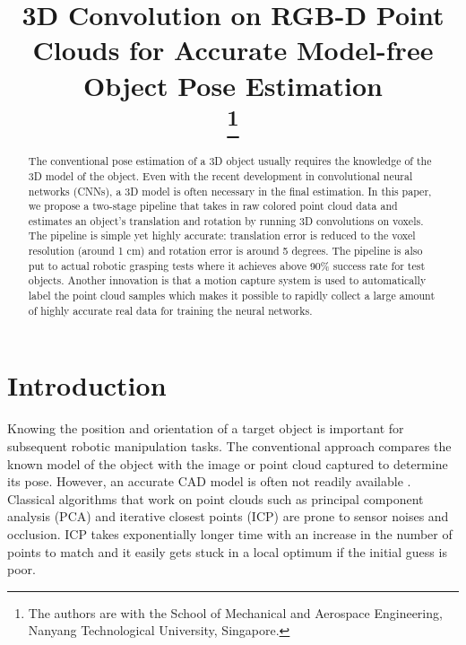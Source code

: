 \documentclass[conference]{IEEEtran}
\begin{document}
\title{3D Convolution on RGB-D Point Clouds for Accurate Model-free Object Pose Estimation \\
\thanks{The authors are with the School of Mechanical and Aerospace Engineering, Nanyang Technological University, Singapore.
}
}

\author{
\and
{}
\and
{}
}

\maketitle

\begin{abstract}
The conventional pose estimation of a 3D object usually requires the knowledge of the 3D model of the object. Even with the recent development in convolutional neural networks (CNNs), a 3D model is often necessary in the final estimation. In this paper, we propose a  two-stage pipeline that takes in raw colored point cloud data and estimates an object’s translation and rotation by running 3D convolutions on voxels. The pipeline is simple yet highly accurate: translation error is reduced to the voxel resolution (around 1 cm) and rotation error is around 5 degrees. The pipeline is also put to actual robotic grasping tests where it achieves above 90\% success rate for test objects. Another innovation is that a motion capture system is used to automatically label the point cloud samples which makes it possible to rapidly collect a large amount of highly accurate real data for training the neural networks.
\end{abstract}


\section{Introduction}
Knowing the position and orientation of a target object is important for subsequent robotic manipulation tasks. The conventional approach compares the known model of the object with the image or point cloud captured to determine its pose. However, an accurate CAD model is often not readily available \cite{saxena_2008_ijrr}. Classical algorithms that work on point clouds such as principal component analysis (PCA) and iterative closest points (ICP) are prone to sensor noises and occlusion. ICP takes exponentially longer time with an increase in the number of points to match and it easily gets stuck in a local optimum if the initial guess is poor.
\end{document}
